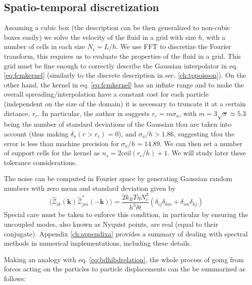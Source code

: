 \documentclass[ twoside,openright,titlepage,numbers=noenddot,%
headinclude,footinclude,cleardoublepage=empty,abstract=on,
BCOR=5mm,paper=a4,fontsize=11pt, dvipsnames
]{scrreprt}
\renewcommand{\vec}[1]{\bm{#1}}
\newcommand{\dt}{\delta t}
\newcommand{\kT}{k_B T}
\newcommand{\fou}[1]{\widehat{#1}}
\begin{document}
\subsection*{Spatio-temporal discretization}
Assuming a cubic box (the description can be then generalized to non-cubic boxes easily) we solve the velocity of the fluid in a grid with size $h$, with a number of cells in each size $N_c = L/h$.
We use \gls{FFT} to discretize the Fourier transform, this requires us to evaluate the properties of the fluid in a grid. This grid must be fine enough to correctly describe the Gaussian interpolator in eq. \eqref{eq:fcmkernel} (similarly to the discrete description in sec. \ref{ch:tppoisson}). On the other hand, the kernel in eq. \eqref{eq:fcmkernel} has an infinte range and to make the overall spreading/interpolation have a constant cost for each particle (independent on the size of the domain) it is necessary to truncate it at a certain distance, $r_c$. In particular, the author in \cite{Keaveny2014} suggests $r_c=m \sigma_a$, with $m=3\sqrt{\pi}\approx 5.3$ being the number of standard deviations of the Gaussian tfou are taken into account (thus making $\delta_a(r>r_c) = 0$), and $\sigma_a/h > 1.86$, suggesting tfou the error is less than machine precision for $\sigma_a/h = 14.89$. We can then set a number of support cells for the kernel as $n_s = 2 \textrm{ceil}(r_c/h)+1$.
We will study later these tolerance considerations.

The noise can be computed in Fourier space by generating Gaussian random numbers with zero mean and standard deviation given by
\begin{equation}
  \langle \fou{\mathcal{Z}}_{ik}(\vec{k})\fou{\mathcal{Z}}^*_{jm} (-\vec{k})\rangle = \frac{2\kT\eta N_c^3}{ h^3 \dt}(\delta_{ij}\delta_{km} + \delta_{im}\delta_{kj})
\end{equation}
Special care must be taken to enforce this condition, in particular by ensuring the uncoupled modes, also known as Nyquist points, are real (equal to their conjugate). Appendix \ref{ch:appendixa} provides a summary of dealing with spectral methods in numerical implementations, including these details.

Making an analogy with eq. \eqref{eq:bdhibdrelation}, the whole process of going from forces acting on the particles to particle displacements can the be summarized as follows:
\end{document}
